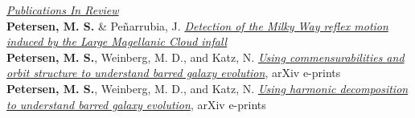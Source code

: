 \documentclass[margin, 11pt]{res} %
\begin{document}
\begin{resume}

\underline{\sl Publications In Review} \\
{\bf \textcolor{blueshade}{Petersen, M. S.}} \& Pe{\~n}arrubia, J.  \href{https://michael-petersen.github.io}{\it Detection of the Milky Way reflex motion induced by the Large Magellanic Cloud infall}\\
{\bf \textcolor{blueshade}{Petersen, M. S.}}, Weinberg, M. D., and Katz, N. \href{https://ui.adsabs.harvard.edu/abs/2019arXiv190205081P/abstract}{\it Using commensurabilities and orbit structure to understand barred galaxy evolution}, arXiv e-prints\\
{\bf \textcolor{blueshade}{Petersen, M. S.}}, Weinberg, M. D., and Katz, N. \href{https://ui.adsabs.harvard.edu/abs/2019arXiv190308203P/abstract}{\it Using harmonic decomposition to understand barred galaxy evolution}, arXiv e-prints\\


\pagebreak







\end{resume}
\end{document}
